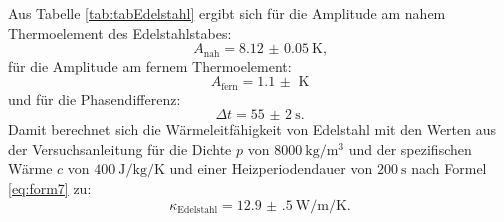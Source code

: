 Aus Tabelle \ref{tab:tabEdelstahl} ergibt sich für die Amplitude am nahem Thermoelement des Edelstahlstabes:
\begin{displaymath}
A_\text{nah} = \SI{8.12(5)}{\kelvin}\text{,}
\end{displaymath}
für die Amplitude am fernem Thermoelement:
\begin{displaymath}
A_\text{fern} = \SI{1.1(0)}{\kelvin}
\end{displaymath}
und für die Phasendifferenz:
\begin{displaymath}
\Delta t = \SI{55(2)}{\second}\text{.}
\end{displaymath}
Damit berechnet sich die Wärmeleitfähigkeit von Edelstahl mit den Werten aus der Versuchsanleitung \cite{V204} für die Dichte $p$ von $\SI{8000}{\kilo\gram\per\meter\tothe{3}}$ und der spezifischen Wärme $c$ von $\SI{400}{\joule\per\kilo\gram\per\kelvin}$ und einer Heizperiodendauer von $\SI{200}{\second}$ nach Formel \eqref{eq:form7} zu:
\begin{displaymath}
\kappa_\text{Edelstahl} = \SI{12.9(5)}{\watt\per\meter\per\kelvin}\text{.}
\end{displaymath}